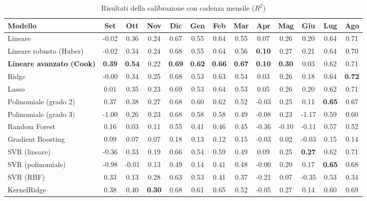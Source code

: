 \begin{table}[H]
    \tiny
    \centering
    \setlength{\tabcolsep}{4pt}
    \def\arraystretch{1.5}
    \begin{tabular}{|l|c|c|c|c|c|c|c|c|c|c|c|c|}
    \hline
        \textbf{Modello} & \textbf{Set} & \textbf{Ott} & \textbf{Nov} & \textbf{Dic} & \textbf{Gen} & \textbf{Feb} & \textbf{Mar} & \textbf{Apr} & \textbf{Mag} & \textbf{Giu} & \textbf{Lug} & \textbf{Ago} \\ \hline
        Lineare & -0.02 & 0.36 & 0.24 & 0.67 & 0.55 & 0.64 & 0.55 & 0.07 & 0.26 & 0.20 & 0.64 & 0.71 \\ \hline
        Lineare robusto (Huber) & -0.02 & 0.34 & 0.24 & 0.68 & 0.55 & 0.64 & 0.56 & \textbf{0.10} & 0.27 & 0.21 & 0.64 & 0.70 \\ \hline
        \textbf{Lineare avanzato (Cook)} & \textbf{0.39} & \textbf{0.54} & 0.22 & \textbf{0.69} & \textbf{0.62} & \textbf{0.66} & \textbf{0.67} & \textbf{0.10} & \textbf{0.30} & 0.03 & 0.62 & 0.71 \\ \hline
        Ridge & -0.00 & 0.34 & 0.25 & 0.68 & 0.53 & 0.63 & 0.54 & 0.03 & 0.26 & 0.18 & 0.64 & \textbf{0.72} \\ \hline
        Lasso & 0.01 & 0.35 & 0.23 & 0.69 & 0.53 & 0.64 & 0.53 & 0.05 & 0.26 & 0.20 & 0.62 & 0.71 \\ \hline
        Polinomiale (grado 2) & 0.37 & 0.38 & 0.27 & 0.68 & 0.60 & 0.62 & 0.52 & -0.03 & 0.25 & 0.11 & \textbf{0.65} & 0.67 \\ \hline
        Polinomiale (grado 3) & -1.00 & 0.26 & 0.23 & 0.68 & 0.58 & 0.58 & 0.49 & -0.08 & 0.23 & -1.17 & 0.59 & 0.60 \\ \hline
        Random Forest & 0.16 & 0.03 & 0.11 & 0.55 & 0.41 & 0.46 & 0.45 & -0.36 & -0.10 & -0.11 & 0.57 & 0.52 \\ \hline
        Gradient Boosting & 0.09 & 0.07 & 0.07 & 0.18 & 0.13 & 0.12 & 0.15 & -0.03 & 0.02 & -0.03 & 0.15 & 0.14 \\ \hline
        SVR (lineare) & -0.36 & 0.33 & 0.19 & 0.66 & 0.54 & 0.59 & 0.49 & 0.09 & 0.25 & \textbf{0.27} & 0.62 & 0.71 \\ \hline
        SVR (polinomiale) & -0.98 & -0.01 & 0.13 & 0.49 & 0.14 & 0.41 & 0.48 & -0.00 & 0.20 & 0.17 & \textbf{0.65} & 0.68 \\ \hline
        SVR (RBF) & 0.33 & 0.13 & 0.28 & 0.63 & 0.53 & 0.41 & 0.37 & -0.21 & 0.07 & -0.35 & 0.53 & 0.34 \\ \hline
        KernelRidge & 0.38 & 0.40 & \textbf{0.30} & 0.68 & 0.61 & 0.65 & 0.52 & -0.05 & 0.27 & 0.14 & 0.60 & 0.69 \\ \hline
    \end{tabular}
    \captionsetup{justification=centering}
    \caption{Risultati della calibrazione  con cadenza mensile ($R^2$)}
    \label{fig:risultati-pm10-mese}
\end{table}

